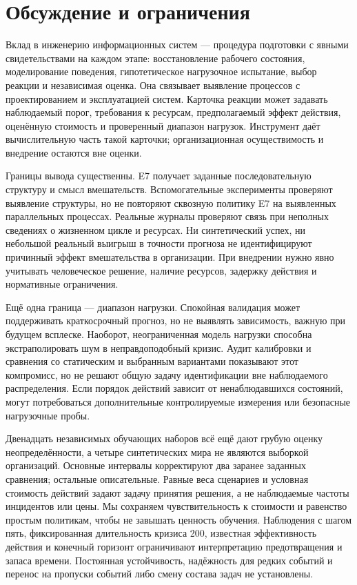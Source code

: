 \documentclass[runningheads]{llncs}
\begin{document}
\section{Обсуждение и ограничения}
Вклад в инженерию информационных систем --- процедура подготовки с явными свидетельствами на каждом этапе: восстановление рабочего состояния, моделирование поведения, гипотетическое нагрузочное испытание, выбор реакции и независимая оценка. Она связывает выявление процессов с проектированием и эксплуатацией систем. Карточка реакции может задавать наблюдаемый порог, требования к ресурсам, предполагаемый эффект действия, оценённую стоимость и проверенный диапазон нагрузок. Инструмент даёт вычислительную часть такой карточки; организационная осуществимость и внедрение остаются вне оценки.

Границы вывода существенны. E7 получает заданные последовательную структуру и смысл вмешательств. Вспомогательные эксперименты проверяют выявление структуры, но не повторяют сквозную политику E7 на выявленных параллельных процессах. Реальные журналы проверяют связь при неполных сведениях о жизненном цикле и ресурсах. Ни синтетический успех, ни небольшой реальный выигрыш в точности прогноза не идентифицируют причинный эффект вмешательства в организации. При внедрении нужно явно учитывать человеческое решение, наличие ресурсов, задержку действия и нормативные ограничения.

Ещё одна граница --- диапазон нагрузки. Спокойная валидация может поддерживать краткосрочный прогноз, но не выявлять зависимость, важную при будущем всплеске. Наоборот, неограниченная модель нагрузки способна экстраполировать шум в неправдоподобный кризис. Аудит калибровки и сравнения со статическим и выбранным вариантами показывают этот компромисс, но не решают общую задачу идентификации вне наблюдаемого распределения. Если порядок действий зависит от ненаблюдавшихся состояний, могут потребоваться дополнительные контролируемые измерения или безопасные нагрузочные пробы.

Двенадцать независимых обучающих наборов всё ещё дают грубую оценку неопределённости, а четыре синтетических мира не являются выборкой организаций. Основные интервалы корректируют два заранее заданных сравнения; остальные описательные. Равные веса сценариев и условная стоимость действий задают задачу принятия решения, а не наблюдаемые частоты инцидентов или цены. Мы сохраняем чувствительность к стоимости и равенство простым политикам, чтобы не завышать ценность обучения. Наблюдения с шагом пять, фиксированная длительность кризиса 200, известная эффективность действия и конечный горизонт ограничивают интерпретацию предотвращения и запаса времени. Постоянная устойчивость, надёжность для редких событий и перенос на пропуски событий либо смену состава задач не установлены.
\end{document}
